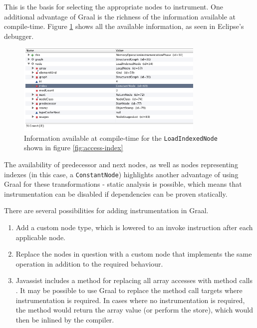 	This is the basis for selecting the appropriate nodes to instrument. One additional advantage of Graal is the richness of the information available at compile-time. Figure \ref{fig:graal-meta} shows all the available information, as seen in Eclipse's debugger.
	
	\begin{figure}[h]
		\centering
		\includegraphics[width=0.8\textwidth]{graphics/graal-metadata.png}
		\caption{Information available at compile-time for the \texttt{LoadIndexedNode} shown in figure \ref{fig:access-index}}
		\label{fig:graal-meta}
	\end{figure}
	
	The availability of predecessor and next nodes, as well as nodes representing indexes (in this case, a \texttt{ConstantNode}) highlights another advantage of using Graal for these transformations - static analysis is possible, which means that instrumentation can be disabled if dependencies can be proven statically. 
	
	There are several possibilities for adding instrumentation in Graal.
	
	\begin{enumerate}
		\item \label{item:instr1} Add a custom node type, which is lowered to an invoke instruction after each applicable node.
	
		\item \label{item:instr2} Replace the nodes in question with a custom node that implements the same operation in addition to the required behaviour.
	
		\item \label{item:instr3} Javassist includes a method for replacing all array accesses with method calls \citep{JavassistDocs}. It may be possible to use Graal to replace the method call targets where instrumentation is required. In cases where no instrumentation is required, the method would return the array value (or perform the store), which would then be inlined by the compiler.
	\end{enumerate}
	
